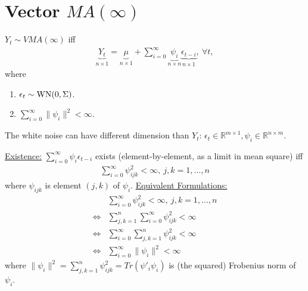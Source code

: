 \documentclass[11pt]{elegantbook}
\begin{document}
\section{Vector $MA(\infty)$}
\begin{definition}
    $Y_t\sim VMA(\infty)$ iff
    \begin{equation}
        \begin{aligned}
            \underbrace{Y_t}_{n\times 1}=\underbrace{\mu}_{n\times 1}+\sum_{i=0}^{\infty}\underbrace{\psi_i}_{n\times n}\underbrace{\epsilon_{t-i}}_{n\times 1},\ \forall t,
        \end{aligned}
        \nonumber
    \end{equation}
    where
    \begin{enumerate}[$\cdot$]
        \item $\epsilon_t\sim \textnormal{WN}(0,\Sigma)$.
        \item $\sum_{i=0}^\infty\|\psi_i\|^2<\infty$.
    \end{enumerate}
    \begin{note}
        The white noise can have different dimension than $Y_t$: $\epsilon_t\in \mathbb{R}^{m\times 1},\psi_i\in \mathbb{R}^{n\times m}$.
    \end{note}
\end{definition}
\underline{Existence:} $\sum_{i=0}^\infty\psi_i\epsilon_{t-i}$ exists (element-by-element, as a limit in mean square) iff
    \begin{equation}
        \begin{aligned}
            \sum_{i=0}^\infty\psi_{ijk}^2<\infty,\ j,k=1,...,n
        \end{aligned}
        \nonumber
    \end{equation}
    where $\psi_{ijk}$ is element $(j,k)$ of $\psi_i$.
\underline{Equivalent Formulations:}
\begin{equation}
    \begin{aligned}
        &\sum_{i=0}^\infty\psi_{ijk}^2<\infty,\ j,k=1,...,n\\
        \Leftrightarrow & \sum_{j,k=1}^n \sum_{i=0}^\infty\psi_{ijk}^2<\infty\\
        \Leftrightarrow & \sum_{i=0}^\infty\sum_{j,k=1}^n\psi_{ijk}^2<\infty\\
        \Leftrightarrow & \sum_{i=0}^\infty\|\psi_i\|^2<\infty
    \end{aligned}
    \nonumber
\end{equation}
where $\|\psi_i\|^2=\sum_{j,k=1}^n\psi_{ijk}^2=Tr(\psi'_i\psi_i)$ is (the squared) Frobenius norm of $\psi_i$.
\end{document}
